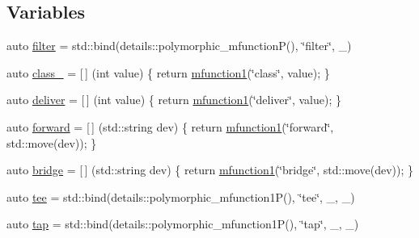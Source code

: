\subsection*{Variables}
\begin{DoxyCompactItemize}
\item 
auto \hyperlink{namespacepfq_1_1lang_1_1experimental_1_1anonymous__namespace_02experimental_8hpp_03_ae9cec76098e666e9b129804f44a93ae1}{filter} = std\+::bind(details\+::polymorphic\+\_\+mfunction\+P(), \char`\"{}filter\char`\"{}, \+\_)
\item 
auto \hyperlink{namespacepfq_1_1lang_1_1experimental_1_1anonymous__namespace_02experimental_8hpp_03_a55ce0b220b42a47460d1d40d3d5fdd5d}{class\+\_\+} = \mbox{[}$\,$\mbox{]} (int value) \{ return \hyperlink{namespacepfq_1_1lang_a68d775c68562fbd0ab9ef213f2519499}{mfunction1}(\char`\"{}class\char`\"{}, value); \}
\item 
auto \hyperlink{namespacepfq_1_1lang_1_1experimental_1_1anonymous__namespace_02experimental_8hpp_03_aabd600ebf1ee62184fa0765f49f9f990}{deliver} = \mbox{[}$\,$\mbox{]} (int value) \{ return \hyperlink{namespacepfq_1_1lang_a68d775c68562fbd0ab9ef213f2519499}{mfunction1}(\char`\"{}deliver\char`\"{}, value); \}
\item 
auto \hyperlink{namespacepfq_1_1lang_1_1experimental_1_1anonymous__namespace_02experimental_8hpp_03_a52cf166afea2ff74bffc6efbf839af0a}{forward} = \mbox{[}$\,$\mbox{]} (std\+::string dev) \{ return \hyperlink{namespacepfq_1_1lang_a68d775c68562fbd0ab9ef213f2519499}{mfunction1}(\char`\"{}forward\char`\"{}, std\+::move(dev)); \}
\item 
auto \hyperlink{namespacepfq_1_1lang_1_1experimental_1_1anonymous__namespace_02experimental_8hpp_03_a03fc8960a5fbbe59f000bd9c5a74b7fe}{bridge} = \mbox{[}$\,$\mbox{]} (std\+::string dev) \{ return \hyperlink{namespacepfq_1_1lang_a68d775c68562fbd0ab9ef213f2519499}{mfunction1}(\char`\"{}bridge\char`\"{}, std\+::move(dev)); \}
\item 
auto \hyperlink{namespacepfq_1_1lang_1_1experimental_1_1anonymous__namespace_02experimental_8hpp_03_a1c49a70b83c2e42067c558a8bfcf8211}{tee} = std\+::bind(details\+::polymorphic\+\_\+mfunction1\+P(), \char`\"{}tee\char`\"{}, \+\_, \+\_)
\item 
auto \hyperlink{namespacepfq_1_1lang_1_1experimental_1_1anonymous__namespace_02experimental_8hpp_03_a66641cfa5d43270458e7fbfb626d0e2e}{tap} = std\+::bind(details\+::polymorphic\+\_\+mfunction1\+P(), \char`\"{}tap\char`\"{}, \+\_, \+\_)
\item 

\end{DoxyCompactItemize}
